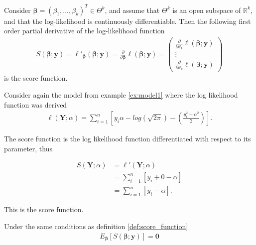 \begin{definition} 
\label{def:score_function}
Consider $\boldsymbol{\beta} = (\beta_1, \ldots, \beta_k)^T \in \Theta^k$, and assume that $\Theta^k$ is an open subspace of $\mathbb{R}^k$, and that the log-likelihood is continuously differentiable. Then  the following first order partial derivative of the log-likelihood function
\begin{align*}
    S(\boldsymbol{\beta}; \textbf{y}) = \ell'_{\boldsymbol{\beta}}(\boldsymbol{\beta}; \textbf{y}) = \frac{\partial}{\partial \boldsymbol{\beta}} \ell (\boldsymbol{\beta}; \textbf{y}) = 
    \begin{pmatrix}
        \frac{\partial}{\partial \theta_1}\ell (\boldsymbol{\beta}; \textbf{y}) \\
        \vdots \\
        \frac{\partial}{\partial \theta_k}\ell (\boldsymbol{\beta}; \textbf{y})
    \end{pmatrix}
\end{align*}
is the score function.
\end{definition}

\begin{example}
Consider again the model from example \ref{ex:model1} where the log likelihood function was derived
\begin{align*}
   \ell(\textbf{Y};\alpha) = \sum_{i = 1}^n \left[y_i \alpha - log\left( \sqrt{2 \pi}\right) - \left( \frac{y_i^2 + \alpha^2}{2} \right) \right].
\end{align*}

The score function is the log likelihood function differentiated with respect to its parameter, thus

\begin{align*}
    S\left( \textbf{Y}; \alpha \right) &= \ell'(\textbf{Y}; \alpha)\\
    &= \sum_{i=1}^n \left[ y_i + 0 - \alpha \right]\\
    &= \sum_{i=1}^n \left[ y_i - \alpha \right].
\end{align*}

This is the score function.

\end{example}

\begin{theorem}
Under the same conditions as definition \ref{def:score_function}
\begin{align*}
    E_{\boldsymbol{\beta}}[S(\boldsymbol{\beta}; \textbf{y})] = \textbf{0}
\end{align*}
\end{theorem}

